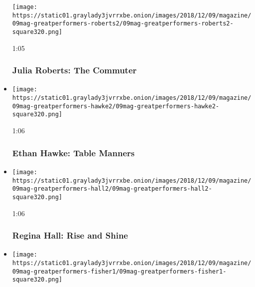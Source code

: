 \begin{itemize}
  \texttt{[image: https://static01.graylady3jvrrxbe.onion/images/2018/12/09/magazine/09mag-greatperformers-roberts2/09mag-greatperformers-roberts2-square320.png]}

  1:05

  \hypertarget{julia-roberts-the-commuter}{%
  \subsubsection{Julia Roberts: The
  Commuter}\label{julia-roberts-the-commuter}}
\item
  \href{https://www.nytimes3xbfgragh.onion/video/magazine/100000006246832/ethan-hawke-table-manners.html?action=click\&module=video-series-bar\&region=header\&pgtype=Article\&playlistId=video/great-performers}{}

  \texttt{[image: https://static01.graylady3jvrrxbe.onion/images/2018/12/09/magazine/09mag-greatperformers-hawke2/09mag-greatperformers-hawke2-square320.png]}

  1:06

  \hypertarget{ethan-hawke-table-manners}{%
  \subsubsection{Ethan Hawke: Table
  Manners}\label{ethan-hawke-table-manners}}
\item
  \href{https://www.nytimes3xbfgragh.onion/video/magazine/100000006246795/regina-hall-rise-and-shine.html?action=click\&module=video-series-bar\&region=header\&pgtype=Article\&playlistId=video/great-performers}{}

  \texttt{[image: https://static01.graylady3jvrrxbe.onion/images/2018/12/09/magazine/09mag-greatperformers-hall2/09mag-greatperformers-hall2-square320.png]}

  1:06

  \hypertarget{regina-hall-rise-and-shine}{%
  \subsubsection{Regina Hall: Rise and
  Shine}\label{regina-hall-rise-and-shine}}
\item
  \href{https://www.nytimes3xbfgragh.onion/video/magazine/100000006246777/elsie-fisher-chance-of-rain.html?action=click\&module=video-series-bar\&region=header\&pgtype=Article\&playlistId=video/great-performers}{}

  \texttt{[image: https://static01.graylady3jvrrxbe.onion/images/2018/12/09/magazine/09mag-greatperformers-fisher1/09mag-greatperformers-fisher1-square320.png]}


\end{itemize}
